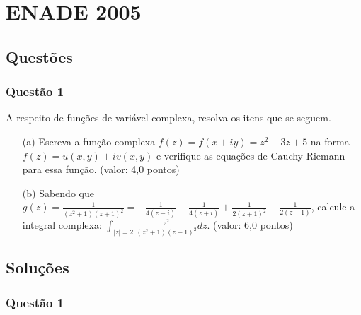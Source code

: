 \chapter{ENADE 2005}

\section{\color{blue} Quest\~oes}

\subsection{\color{blue} Quest\~ao 1}

A respeito de fun\c c\~oes de vari\'avel complexa, resolva os itens que se seguem.

\begin{enumerate}

\item[(a)] Escreva a fun\c c\~ao complexa $f(z) = f(x + iy) = z^2 -3z + 5$ na forma $f(z) = u(x, y) + i v(x, y)$ e verifique as equa\c c\~oes de Cauchy-Riemann para essa fun\c c\~ao. (valor: 4,0 pontos)

\item[(b)] Sabendo que $g(z)=\displaystyle \frac1{(z^2+1)(z+1)^2}=-\frac1{4(z-i)}-\frac1{4(z+i)}+\frac1{2(z+1)^2}+\frac1{2(z+1)}$, calcule a integral complexa: $\displaystyle \int_{|z|=2}\frac{z^2}{(z^2+1)(z+1)^2}dz$. (valor: 6,0 pontos)

\end{enumerate}

\section{\color{red} Solu\c c\~oes}

\subsection{\color{red} Quest\~ao 1}

